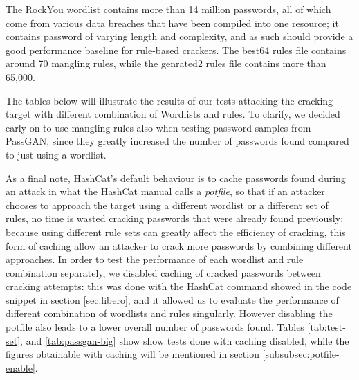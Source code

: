 The RockYou wordlist contains more than 14 million passwords, all of which come from various data breaches that have been compiled into one resource; it contains password of varying length and complexity, and as such should provide a good performance baseline for rule-based crackers. The best64 rules file contains around 70 mangling rules, while the genrated2 rules file contains more than 65,000. 

The tables below will illustrate the results of our tests attacking the cracking target with different combination of Wordlists and rules. To clarify, we decided early on to use mangling rules also when testing password samples from PassGAN, since they greatly increased the number of passwords found compared to just using a wordlist. %

As a final note, HashCat's default behaviour is to cache passwords found during an attack in what the HashCat manual calls a \emph{potfile}, so that if an attacker chooses to approach the target using a different wordlist or a different set of rules, no time is wasted cracking passwords that were already found previously; because using different rule sets can greatly affect the efficiency of cracking, this form of caching allow an attacker to crack more passwords by combining different approaches.
In order to test the performance of each wordlist and rule combination separately, we disabled caching of cracked passwords between cracking attempts: this was done with the HashCat command showed in the code snippet in section \ref{sec:libero}, and it allowed us to evaluate the performance of different combination of wordlists and rules singularly. However disabling the potfile also leads to a lower overall number of passwords found. Tables \ref{tab:test-set}, and \ref{tab:passgan-big} show show tests done with caching disabled, while the figures obtainable with caching will be mentioned in section \ref{subsubsec:potfile-enable}. 

